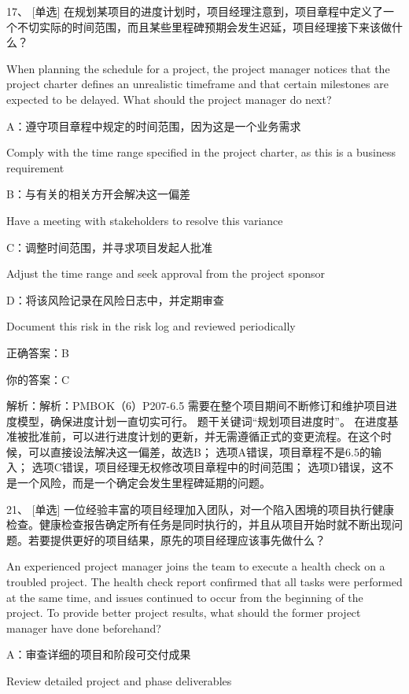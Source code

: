 17、 [单选] 在规划某项目的进度计划时，项目经理注意到，项目章程中定义了一个不切实际的时间范围，而且某些里程碑预期会发生迟延，项目经理接下来该做什么？

When planning the schedule for a project, the project manager notices that the project charter defines an unrealistic timeframe and that certain milestones are expected to be delayed. What should the project manager do next?

A：遵守项目章程中规定的时间范围，因为这是一个业务需求

Comply with the time range specified in the project charter, as this is a business requirement

B：与有关的相关方开会解决这一偏差

Have a meeting with stakeholders to resolve this variance

C：调整时间范围，并寻求项目发起人批准

Adjust the time range and seek approval from the project sponsor

D：将该风险记录在风险日志中，并定期审查

Document this risk in the risk log and reviewed periodically

正确答案：B

你的答案：C

解析：解析：PMBOK（6）P207-6.5 需要在整个项目期间不断修订和维护项目进度模型，确保进度计划一直切实可行。 题干关键词“规划项目进度时”。 在进度基准被批准前，可以进行进度计划的更新，并无需遵循正式的变更流程。在这个时候，可以直接设法解决这一偏差，故选B； 选项A错误，项目章程不是6.5的输入； 选项C错误，项目经理无权修改项目章程中的时间范围； 选项D错误，这不是一个风险，而是一个确定会发生里程碑延期的问题。



21、 [单选] 一位经验丰富的项目经理加入团队，对一个陷入困境的项目执行健康检查。健康检查报告确定所有任务是同时执行的，并且从项目开始时就不断出现问题。若要提供更好的项目结果，原先的项目经理应该事先做什么？

An experienced project manager joins the team to execute a health check on a troubled project. The health check report confirmed that all tasks were performed at the same time, and issues continued to occur from the beginning of the project. To provide better project results, what should the former project manager have done beforehand?

A：审查详细的项目和阶段可交付成果

Review detailed project and phase deliverables

